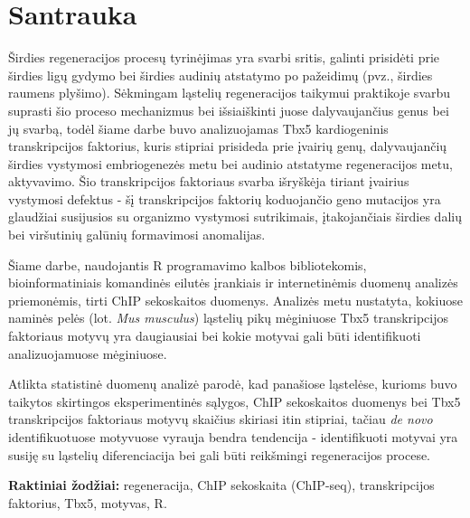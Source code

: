 \documentclass[12pt]{article}
\begin{document}
\section*{Santrauka}
Širdies regeneracijos procesų tyrinėjimas yra svarbi sritis, galinti
prisidėti prie širdies ligų gydymo bei širdies audinių atstatymo po
pažeidimų (pvz., širdies raumens plyšimo). Sėkmingam ląstelių regeneracijos
taikymui praktikoje svarbu suprasti šio proceso mechanizmus bei išsiaiškinti
juose dalyvaujančius genus bei jų svarbą, todėl šiame darbe buvo analizuojamas
Tbx5 kardiogeninis transkripcijos faktorius, kuris stipriai prisideda prie
įvairių genų, dalyvaujančių širdies vystymosi embriogenezės metu bei audinio
atstatyme regeneracijos metu, aktyvavimo. Šio transkripcijos faktoriaus svarba
išryškėja tiriant įvairius vystymosi defektus - šį
transkripcijos faktorių koduojančio geno mutacijos yra glaudžiai susijusios su
organizmo vystymosi sutrikimais, įtakojančiais širdies dalių bei viršutinių
galūnių formavimosi anomalijas.
                                                                                     
Šiame darbe, naudojantis R programavimo kalbos bibliotekomis,
bioinformatiniais komandinės eilutės įrankiais ir internetinėmis duomenų
analizės priemonėmis, tirti ChIP sekoskaitos duomenys. Analizės metu
nustatyta, kokiuose naminės pelės (lot. \emph{Mus musculus}) ląstelių
pikų mėginiuose Tbx5 transkripcijos faktoriaus motyvų yra daugiausiai bei
kokie motyvai gali būti identifikuoti analizuojamuose mėginiuose.

Atlikta statistinė duomenų analizė parodė, kad panašiose ląstelėse,
kurioms buvo taikytos skirtingos eksperimentinės sąlygos, ChIP sekoskaitos
duomenys bei Tbx5 transkripcijos faktoriaus motyvų skaičius skiriasi itin
stipriai, tačiau \emph{de novo} identifikuotuose motyvuose vyrauja bendra
tendencija - identifikuoti motyvai yra susiję su ląstelių diferenciacija
bei gali būti reikšmingi regeneracijos procese.

\hfill \break
\textbf{Raktiniai žodžiai:} regeneracija, ChIP sekoskaita (ChIP-seq),
    transkripcijos faktorius, Tbx5, motyvas, R.
\newpage

\end{document}
